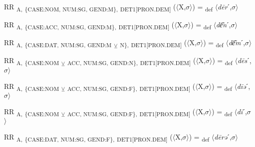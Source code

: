 {\begin{exe}
 RR \textsubscript{A,} \textsubscript{\{CASE:NOM, NUM:SG, GEND:M\},} \textsubscript{DET1[PRON.DEM]} ($\langle$X,$\sigma $$\rangle$) = \textsubscript{def} $\langle$\textit{d\=er}ˊ,$\sigma $$\rangle$
\end{exe}

\begin{exe}
 RR \textsubscript{A,} \textsubscript{\{CASE:ACC, NUM:SG, GEND:M\},} \textsubscript{DET1[PRON.DEM]} ($\langle$X,$\sigma $$\rangle$) = \textsubscript{def} $\langle$\textit{d\=e͂n}ˊ,$\sigma $$\rangle$
\end{exe}

\begin{exe}
 RR \textsubscript{A,} \textsubscript{\{CASE:DAT, NUM:SG, GEND:M} \textsubscript{${\veebar}$}\textsubscript{ N\},} \textsubscript{DET1[PRON.DEM]} ($\langle$X,$\sigma $$\rangle$) = \textsubscript{def} $\langle$\textit{d\=e͂m}ˊ,$\sigma $$\rangle$
\end{exe}

\begin{exe}
 RR \textsubscript{A,} \textsubscript{\{CASE:NOM} \textsubscript{${\veebar}$}\textsubscript{ ACC, NUM:SG, GEND:N\},} \textsubscript{DET1[PRON.DEM]} ($\langle$X,$\sigma $$\rangle$) = \textsubscript{def} $\langle$\textit{d\=es}ˊ,$\sigma $$\rangle$
\end{exe}

\begin{exe}
 RR \textsubscript{A,} \textsubscript{\{CASE:NOM} \textsubscript{${\veebar}$}\textsubscript{ ACC, NUM:SG, GEND:F\},} \textsubscript{DET1[PRON.DEM]} ($\langle$X,$\sigma $$\rangle$) = \textsubscript{def} $\langle$\textit{d\=iə}ˊ,$\sigma $$\rangle$
\end{exe}

\begin{exe}
 RR \textsubscript{A,} \textsubscript{\{CASE:NOM} \textsubscript{${\veebar}$}\textsubscript{ ACC, NUM:SG, GEND:F\},} \textsubscript{DET1[PRON.DEM]} ($\langle$X,$\sigma $$\rangle$) = \textsubscript{def} $\langle$\textit{d\=i}ˊ,$\sigma $$\rangle$
\end{exe}

\begin{exe}
 RR \textsubscript{A,} \textsubscript{\{CASE:DAT, NUM:SG, GEND:F\},} \textsubscript{DET1[PRON.DEM]} ($\langle$X,$\sigma $$\rangle$) = \textsubscript{def} $\langle$\textit{d\=erə}ˊ,$\sigma $$\rangle$
\end{exe}

}
